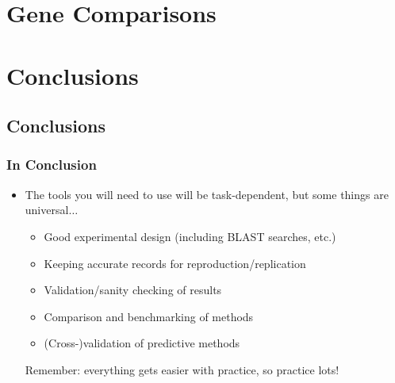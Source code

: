 \section{Gene Comparisons}
  


\section{Conclusions}
  \subsection{Conclusions}
\begin{frame}[fragile]
  \frametitle{In Conclusion}
  \begin{itemize}
    \item The tools you will need to use will be task-dependent, but some things are universal$\ldots$
    \begin{itemize}
      \item Good experimental design (including BLAST searches, etc.)
      \item Keeping accurate records for reproduction/replication
      \item Validation/sanity checking of results
      \item Comparison and benchmarking of methods
      \item (Cross-)validation of predictive methods
    \end{itemize}
     Remember: everything gets easier with practice, so practice lots!   
  \end{itemize}
\end{frame}



